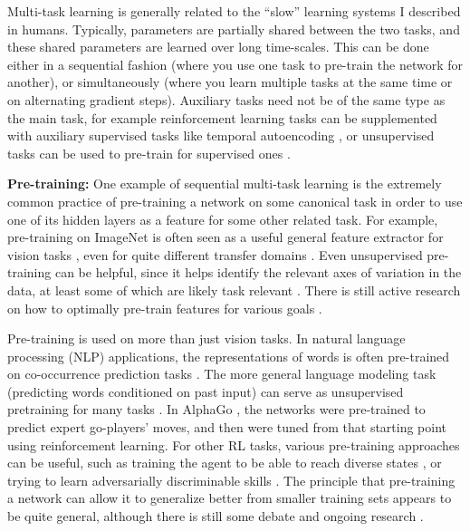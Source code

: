 Multi-task learning is generally related to the ``slow'' learning systems I described in humans. Typically, parameters are partially shared between the two tasks, and these shared parameters are learned over long time-scales. This can be done either in a sequential fashion (where you use one task to pre-train the network for another), or simultaneously (where you learn multiple tasks at the same time or on alternating gradient steps). Auxiliary tasks need not be of the same type as the main task, for example reinforcement learning tasks can be supplemented with auxiliary supervised tasks like temporal autoencoding \citep[e.g.][]{Hermann2017}, or unsupervised tasks can be used to pre-train for supervised ones \citep[e.g.][]{Wu2018}. \par
\textbf{Pre-training:} One example of sequential multi-task learning is the extremely common practice of pre-training a network on some canonical task in order to use one of its hidden layers as a feature for some other related task. For example, pre-training on ImageNet \citep{Deng2009} is often seen as a useful general feature extractor for vision tasks \citep{Huh2016}, even for quite different transfer domains \citep[e.g.][]{Marmanis2016}. Even unsupervised pre-training can be helpful, since it helps identify the relevant axes of variation in the data, at least some of which are likely task relevant \citep{Erhan2010}. There is still active research on how to optimally pre-train features for various goals \citep[e.g.][]{Wu2018}. \par    
Pre-training is used on more than just vision tasks. In natural language processing (NLP) applications, the representations of words is often pre-trained on co-occurrence prediction tasks \citep[e.g.][]{Pennington2014}. The more general language modeling task (predicting words conditioned on past input) can serve as unsupervised pretraining for many tasks \citep[e.g.][]{Radford2019}. In AlphaGo \citep{Silver2016}, the networks were pre-trained to predict expert go-players' moves, and then were tuned from that starting point using reinforcement learning. For other RL tasks, various pre-training approaches can be useful, such as training the agent to be able to reach diverse states \citep{Gregor2016}, or trying to learn adversarially discriminable skills \citep{Eysenbach2019}. The principle that pre-training a network can allow it to generalize better from smaller training sets appears to be quite general, although there is still some debate and ongoing research \citep[e.g]{He2018, Silver2017}. \par
